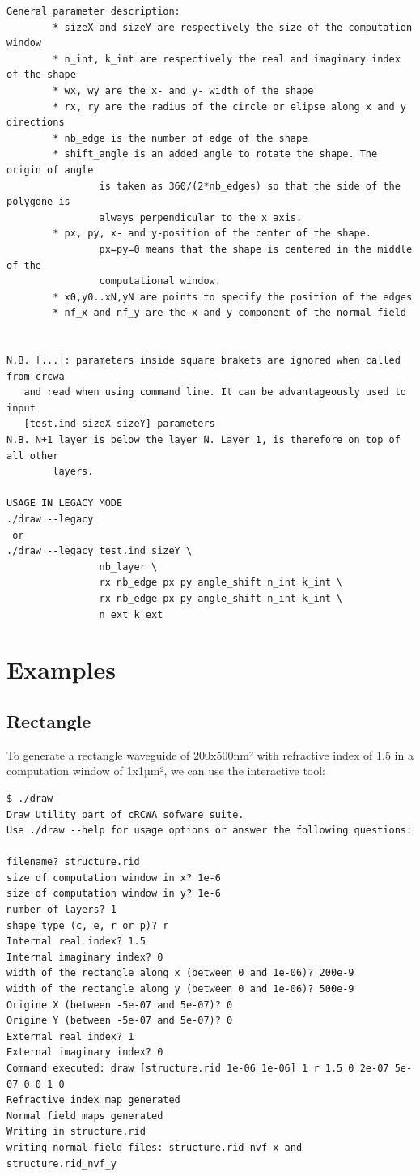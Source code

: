 \begin{lstlisting}
General parameter description:
        * sizeX and sizeY are respectively the size of the computation window
        * n_int, k_int are respectively the real and imaginary index of the shape
        * wx, wy are the x- and y- width of the shape
        * rx, ry are the radius of the circle or elipse along x and y directions
        * nb_edge is the number of edge of the shape
        * shift_angle is an added angle to rotate the shape. The origin of angle
                is taken as 360/(2*nb_edges) so that the side of the polygone is 
                always perpendicular to the x axis.
        * px, py, x- and y-position of the center of the shape. 
                px=py=0 means that the shape is centered in the middle of the 
                computational window.
        * x0,y0..xN,yN are points to specify the position of the edges
        * nf_x and nf_y are the x and y component of the normal field


N.B. [...]: parameters inside square brakets are ignored when called from crcwa
   and read when using command line. It can be advantageously used to input    
   [test.ind sizeX sizeY] parameters
N.B. N+1 layer is below the layer N. Layer 1, is therefore on top of all other
        layers.

USAGE IN LEGACY MODE
./draw --legacy 
 or
./draw --legacy test.ind sizeY \
                nb_layer \
                rx nb_edge px py angle_shift n_int k_int \
                rx nb_edge px py angle_shift n_int k_int \
                n_ext k_ext
\end{lstlisting}

\section{Examples}
\subsection{Rectangle}
To generate a rectangle waveguide of 200x500nm² with refractive index of 1.5 in a computation window of 1x1µm², we can use the interactive tool:

\begin{lstlisting}
$ ./draw
Draw Utility part of cRCWA sofware suite. 
Use ./draw --help for usage options or answer the following questions:
 
filename? structure.rid
size of computation window in x? 1e-6
size of computation window in y? 1e-6
number of layers? 1
shape type (c, e, r or p)? r
Internal real index? 1.5
Internal imaginary index? 0
width of the rectangle along x (between 0 and 1e-06)? 200e-9
width of the rectangle along y (between 0 and 1e-06)? 500e-9
Origine X (between -5e-07 and 5e-07)? 0
Origine Y (between -5e-07 and 5e-07)? 0
External real index? 1
External imaginary index? 0
Command executed: draw [structure.rid 1e-06 1e-06] 1 r 1.5 0 2e-07 5e-07 0 0 1 0 
Refractive index map generated
Normal field maps generated
Writing in structure.rid
writing normal field files: structure.rid_nvf_x and structure.rid_nvf_y
\end{lstlisting}

